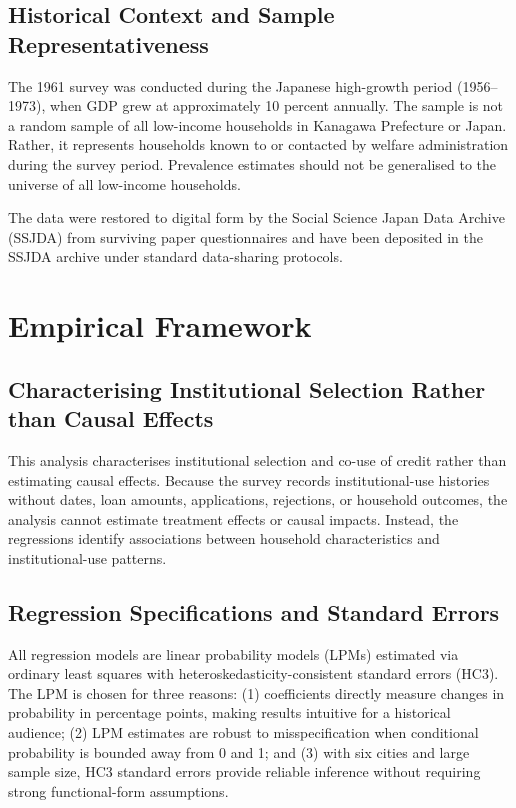 \documentclass[12pt]{article}
\begin{document}
\subsection{Historical Context and Sample Representativeness}

The 1961 survey was conducted during the Japanese high-growth period (1956--1973), when GDP grew at approximately 10 percent annually. The sample is not a random sample of all low-income households in Kanagawa Prefecture or Japan. Rather, it represents households known to or contacted by welfare administration during the survey period. Prevalence estimates should not be generalised to the universe of all low-income households.

The data were restored to digital form by the Social Science Japan Data Archive (SSJDA) from surviving paper questionnaires and have been deposited in the SSJDA archive under standard data-sharing protocols.

\newpage
\section{Empirical Framework}

\subsection{Characterising Institutional Selection Rather than Causal Effects}

This analysis characterises institutional selection and co-use of credit rather than estimating causal effects. Because the survey records institutional-use histories without dates, loan amounts, applications, rejections, or household outcomes, the analysis cannot estimate treatment effects or causal impacts. Instead, the regressions identify associations between household characteristics and institutional-use patterns.

\subsection{Regression Specifications and Standard Errors}

All regression models are linear probability models (LPMs) estimated via ordinary least squares with heteroskedasticity-consistent standard errors (HC3). The LPM is chosen for three reasons: (1) coefficients directly measure changes in probability in percentage points, making results intuitive for a historical audience; (2) LPM estimates are robust to misspecification when conditional probability is bounded away from 0 and 1; and (3) with six cities and large sample size, HC3 standard errors provide reliable inference without requiring strong functional-form assumptions.
\end{document}

